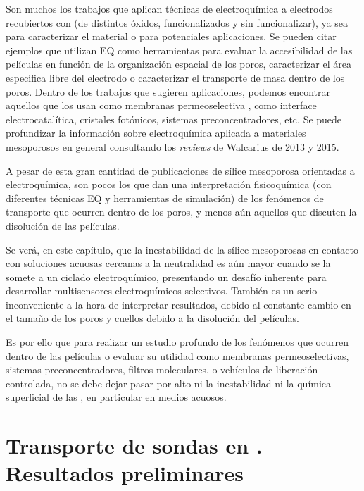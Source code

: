 	Son muchos los trabajos que aplican técnicas de electroquímica a electrodos recubiertos con \pdm\space (de distintos óxidos, funcionalizados y sin funcionalizar), ya sea para caracterizar el material o para potenciales aplicaciones. Se pueden citar ejemplos que utilizan EQ como herramientas para evaluar la accesibilidad de las películas en función de la organización espacial de los poros\cite{Etienne2007,Herzog2013,karman2016}, caracterizar el área especifica libre del electrodo \cite{Otal2006} o caracterizar el transporte de masa dentro de los poros\cite{Calvo2009,brunsen2011}. Dentro de los trabajos que sugieren aplicaciones, podemos encontrar aquellos que los usan como membranas permeoselectiva \cite{Fattakhova-Rohlfing2007,Andrieu-Brunsen2015,Calvo2009,nasir2018}, como interface electrocatalítica\cite{BaeJ.HanJ.Chung2012}, cristales fotónicos\cite{Gimenez2017}, sistemas preconcentradores\cite{Etienne2015,Gimenez2016-2}, etc. Se puede profundizar la información sobre electroquímica aplicada a materiales mesoporosos en general consultando los \textit{reviews} de Walcarius de 2013\cite{walcarius2013,Etienne2013} y 2015\cite{Etienne2015}.

	A pesar de esta gran cantidad de publicaciones de sílice mesoporosa orientadas a electroquímica, son pocos los que dan una interpretación fisicoquímica (con diferentes técnicas EQ y herramientas de simulación) de los fenómenos de transporte que ocurren dentro de los poros, y menos aún aquellos que discuten la disolución de las películas. 

	Se verá, en este capítulo, que la inestabilidad de la sílice mesoporosas en contacto con soluciones acuosas cercanas a la neutralidad es aún mayor cuando se la somete a un ciclado electroquímico, presentando un desafío inherente para desarrollar multisensores electroquímicos selectivos. También es un serio inconveniente a la hora de interpretar resultados, debido al constante cambio en el tamaño de los poros y cuellos debido a la disolución del películas. 

	Es por ello que para realizar un estudio profundo de los fenómenos que ocurren dentro de las películas o evaluar su utilidad como membranas permeoselectivas, sistemas preconcentradores, filtros moleculares, o vehículos de liberación controlada, no se debe dejar pasar por alto ni la inestabilidad ni la química superficial de las \pdm, en particular en medios acuosos. 
	
\section{Transporte de sondas en \pdm. Resultados preliminares}

